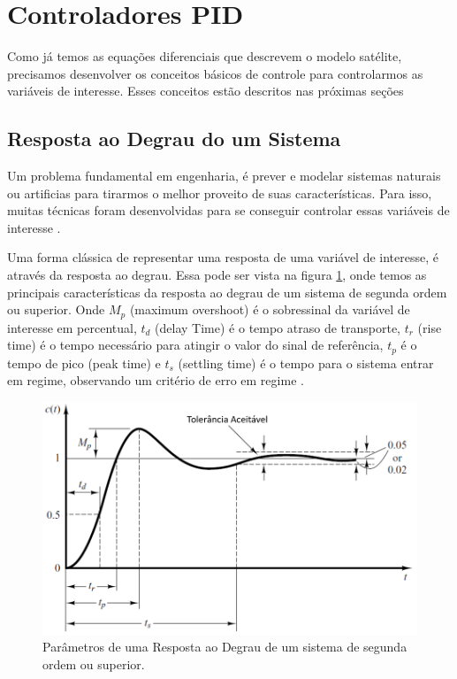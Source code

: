 
\section{Controladores PID}

Como já temos as equações diferenciais que descrevem o modelo satélite, precisamos desenvolver os conceitos básicos de controle para controlarmos as variáveis de interesse. Esses conceitos estão descritos nas próximas seções



\subsection{Resposta ao Degrau do um Sistema}

Um problema fundamental em engenharia, é prever e modelar sistemas naturais ou artificias para tirarmos o melhor proveito de suas características. Para isso, muitas técnicas foram desenvolvidas para se conseguir controlar essas variáveis de interesse \cite{Levine1996}.

Uma forma clássica de representar uma resposta de uma variável de interesse, é através da resposta ao degrau. Essa pode ser vista na figura \ref{fig:transient_ogata_p170}, onde temos as principais características da resposta ao degrau de um sistema de segunda ordem ou superior. Onde \textit{$M_p$} (maximum overshoot) é o sobressinal da variável de interesse em percentual, \textit{$t_d$} (delay Time) é o tempo atraso de transporte, \textit{$t_r$} (rise time) é o tempo necessário para atingir o valor do sinal de referência, \textit{$t_p$} é o tempo de pico (peak time) e \textit{$t_s$} (settling time) é o tempo para o sistema entrar em regime, observando um critério de erro em regime \cite{Ogata}.

\begin{figure}[H]
  \caption{Parâmetros de uma Resposta ao Degrau de um sistema de segunda ordem ou superior.}
  \begin{center}
      \includegraphics[scale=0.5]{referencial/img/transient_ogata_p170}
  \end{center}
  \label{fig:transient_ogata_p170}
\end{figure}

